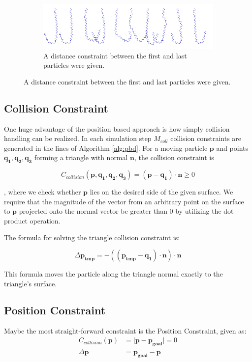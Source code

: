 \documentclass[sigplan,screen,nonacm]{acmart}
\renewcommand{\b}{\boldsymbol}
\begin{document}
\begin{figure}
\begin{subfigure}{.5\linewidth}
    \end{subfigure}%
    \begin{subfigure}{.5\linewidth}
        \caption{A distance constraint between the first and last particles
        were given. }
    \includegraphics[width=\linewidth]{bend_con_first_last_10Sim_40Seg_0.015lSeg.png}
    \end{subfigure}%
\end{figure}

\subsection{Collision Constraint}
One huge advantage of the position based approach is how simply collision
handling can be realized. In each simulation step $M_{coll}$ collision
constraints are generated in the  lines of Algorithm
\ref{alg:pbd}. For a moving particle $\b{p}$ and points $\b{q_1}, \b{q_2},
\b{q_3}$ forming a triangle with normal $\b{n}$, the collision constraint is

$$
C_{collision}(\b{p}, \b{q_1}, \b{q_2}, \b{q_3}) = (\b{p}-\b{q_1})\cdot \b{n} \geq 0
$$

, where we check whether $\b{p}$ lies on the desired side of the given
surface. We require that the magnitude of the vector from an arbitrary point
on the surface to $\b{p}$ projected onto the normal vector be greater than 0 by
utilizing the dot product operation.

The formula for solving the triangle collision constraint is:

$$
\Delta \b{p_{tmp}} = -((\b{p_{tmp}}-\b{q_1})\cdot \b{n})\cdot \b{n}
$$

This formula moves the particle along the triangle normal exactly to the
triangle's surface. 

\subsection{Position Constraint}
Maybe the most straight-forward constraint is the Position Constraint, given as:
\begin{align*}
    C_{collision}(\b{p}) &= \lvert \b{p} - \b{p_{goal}} \rvert = 0
    \\
    \Delta \b{p} &= \b{p_{goal}} - \b{p}
\end{align*}
\end{document}
